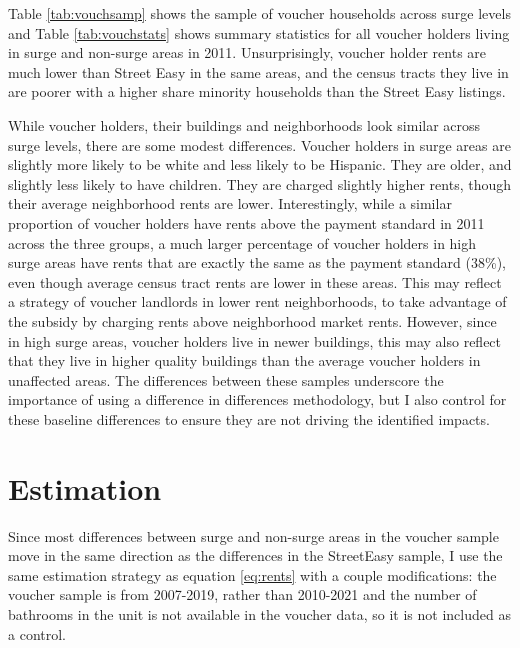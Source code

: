 \documentclass[12pt]{article}
\begin{document}
{{{{{Table \ref{tab:vouchsamp} shows the sample of voucher households across surge levels and Table \ref{tab:vouchstats} shows summary statistics for all voucher holders living in surge and non-surge areas in 2011. Unsurprisingly, voucher holder rents are much lower than Street Easy in the same areas, and the census tracts they live in are poorer with a higher share minority households than the Street Easy listings.  

While voucher holders, their buildings and neighborhoods look similar across surge levels, there are some modest differences.  Voucher holders in surge areas are slightly more likely to be white and less likely to be Hispanic.  They are older, and slightly less likely to have children. They are charged slightly higher rents, though their average neighborhood rents are lower.  Interestingly, while a similar proportion of voucher holders have rents above the payment standard in 2011 across the three groups, a much larger percentage of voucher holders in high surge areas have rents that are exactly the same as the payment standard (38\%), even though average census tract rents are lower in these areas.  This may reflect a strategy of voucher landlords in lower rent neighborhoods, to take advantage of the subsidy by charging rents above neighborhood market rents.  However, since in high surge areas, voucher holders live in newer buildings, this may also reflect that they live in higher quality buildings than the average voucher holders in unaffected areas.   The differences between these samples underscore the importance of using a difference in differences methodology, but I also control for these baseline differences to ensure they are not driving the identified impacts.  


\section{Estimation}
Since most differences between surge and non-surge areas in the voucher sample move in the same direction as the differences in the StreetEasy sample, I use the same estimation strategy as equation \ref{eq:rents} with a couple modifications: the voucher sample is from 2007-2019, rather than 2010-2021 and the number of bathrooms in the unit is not available in the voucher data, so it is not included as a control.  

}}}}}
\end{document}
